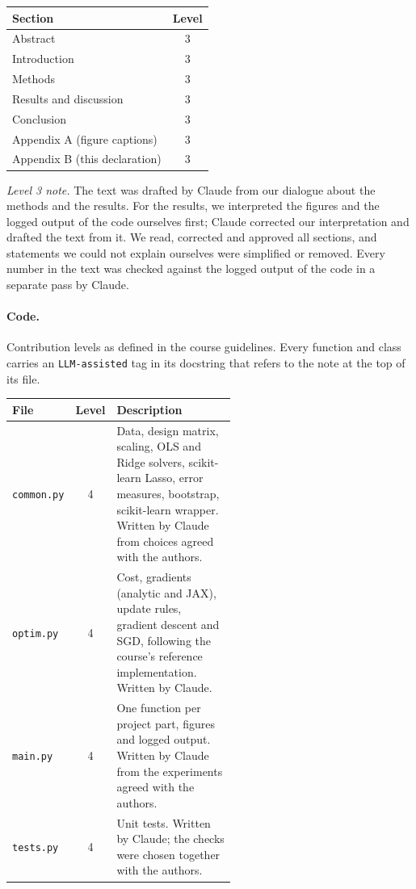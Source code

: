 \begin{table}[h]
    \centering
    \begin{tabular}{lc}
        \toprule
        Section & Level \\
        \midrule
        Abstract & 3 \\
        Introduction & 3 \\
        Methods & 3 \\
        Results and discussion & 3 \\
        Conclusion & 3 \\
        Appendix A (figure captions) & 3 \\
        Appendix B (this declaration) & 3 \\
        \bottomrule
    \end{tabular}
\end{table}

\emph{Level 3 note.} The text was drafted by Claude from our dialogue about the methods and the results. For the results, we interpreted the figures and the logged output of the code ourselves first; Claude corrected our interpretation and drafted the text from it. We read, corrected and approved all sections, and statements we could not explain ourselves were simplified or removed. Every number in the text was checked against the logged output of the code in a separate pass by Claude.

\paragraph*{Code.} Contribution levels as defined in the course guidelines. Every function and class carries an \texttt{LLM-assisted} tag in its docstring that refers to the note at the top of its file.

\begin{table}[h]
    \centering
    \begin{tabular}{lcp{0.55\linewidth}}
        \toprule
        File & Level & Description \\
        \midrule
        \texttt{common.py} & 4 & Data, design matrix, scaling, OLS and Ridge solvers, scikit-learn Lasso, error measures, bootstrap, scikit-learn wrapper. Written by Claude from choices agreed with the authors. \\
        \texttt{optim.py} & 4 & Cost, gradients (analytic and JAX), update rules, gradient descent and SGD, following the course's reference implementation. Written by Claude. \\
        \texttt{main.py} & 4 & One function per project part, figures and logged output. Written by Claude from the experiments agreed with the authors. \\
        \texttt{tests.py} & 4 & Unit tests. Written by Claude; the checks were chosen together with the authors. \\
        \bottomrule
    \end{tabular}
\end{table}

